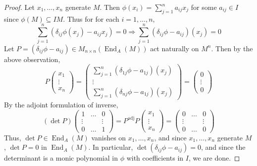 \documentclass[11pt, a4paper]{memoir}
\theoremstyle{change}
\theoremstyle{plain}
\theoremstyle{nonumberplain}
\newtheorem{proof}{Proof}
\DeclareMathOperator{\End}{End}
\numberwithin{equation}{section}
\begin{document}
\begin{proof}
    Let $x_1,\ldots,x_n$ generate $M$.
    Then $\phi(x_i)=\sum_{j=1}^n a_{ij}x_j$ for some $a_{ij}\in I$ since $\phi(M)\subseteq IM$.
    Thus for for each $i=1,\ldots,n$,
    \begin{equation*}
        \sum\limits_{j=1}^n\left(\delta_{ij}\phi(x_j)-a_{ij}x_j\right)=0\Longrightarrow \sum\limits_{j=1}^n(\delta_{ij}\phi-a_{ij})(x_j)=0
    \end{equation*}
    Let $P=(\delta_{ij}\phi-a_{ij})\in M_{n\times n}(\End_A(M))$ act naturally on $M^n$.
    Then by the above observation,
    \begin{equation*}
        P\begin{pmatrix}x_1\\\vdots\\x_n\end{pmatrix}=\begin{pmatrix}\sum\limits_{j=1}^n(\delta_{1j}\phi-a_{1j})(x_j)\\\vdots\\\sum\limits_{j=1}^n(\delta_{nj}\phi-a_{1j})(x_j)\end{pmatrix}=\begin{pmatrix}0\\\vdots\\0\end{pmatrix}
    \end{equation*}
    By the adjoint formulation of inverse,
    \begin{equation*}
        (\det P)
        \begin{pmatrix}
            1&\hdots&0\\
            \vdots&&\vdots\\
            0&\hdots&1
        \end{pmatrix}=
        P^{\text{adj}}P\begin{pmatrix}x_1\\\vdots\\x_n\end{pmatrix}=\begin{pmatrix}0&\hdots&0\\\vdots&&\vdots\\0&\hdots&0\end{pmatrix}
    \end{equation*}
    Thus, $\det P\in\End_A(M)$ vanishes on $x_1,\ldots,x_n$, and since $x_1,\ldots,x_n$ generate $M$, $\det P=0$ in $\End_A(M)$.
    In particular, $\det(\delta_{ij}\phi-a_{ij})=0$, and since the determinant is a monic polynomial in $\phi$ with coefficients in $I$, we are done.
\end{proof}
\end{document}
